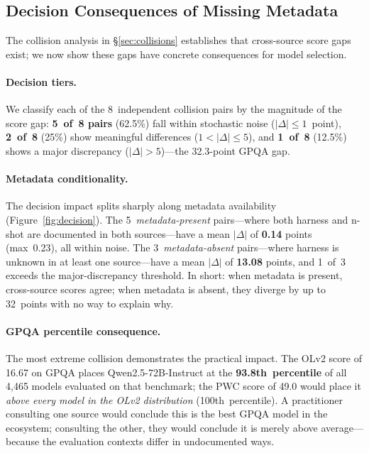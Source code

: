 
\subsection{Decision Consequences of Missing Metadata}\label{sec:decision}

The collision analysis in \S\ref{sec:collisions} establishes that
cross-source score gaps exist; we now show these gaps have concrete
consequences for model selection.

\paragraph{Decision tiers.}
We classify each of the 8~independent collision pairs by the
magnitude of the score gap: \textbf{5~of~8 pairs} (62.5\%) fall
within stochastic noise ($|\Delta| \leq 1$~point), \textbf{2~of~8}
(25\%) show meaningful differences ($1 < |\Delta| \leq 5$), and
\textbf{1~of~8} (12.5\%) shows a major discrepancy
($|\Delta| > 5$)---the 32.3-point GPQA gap.

\paragraph{Metadata conditionality.}
The decision impact splits sharply along metadata availability
(Figure~\ref{fig:decision}). The 5~\emph{metadata-present}
pairs---where both harness and n-shot are documented in both
sources---have a mean $|\Delta|$ of \textbf{0.14} points
(max~0.23), all within noise. The 3~\emph{metadata-absent}
pairs---where harness is unknown in at least one source---have a
mean $|\Delta|$ of \textbf{13.08} points, and 1~of~3 exceeds the
major-discrepancy threshold. In short: when metadata is present,
cross-source scores agree; when metadata is absent, they diverge
by up to 32~points with no way to explain why.

\paragraph{GPQA percentile consequence.}
The most extreme collision demonstrates the practical impact. The
OLv2 score of 16.67 on GPQA places Qwen2.5-72B-Instruct at the
\textbf{93.8th~percentile} of all 4{,}465 models evaluated on that
benchmark; the PWC score of 49.0 would place it \emph{above every
model in the OLv2 distribution} (100th~percentile). A
practitioner consulting one source would conclude this is the best
GPQA model in the ecosystem; consulting the other, they would
conclude it is merely above average---because the evaluation
contexts differ in undocumented ways.

